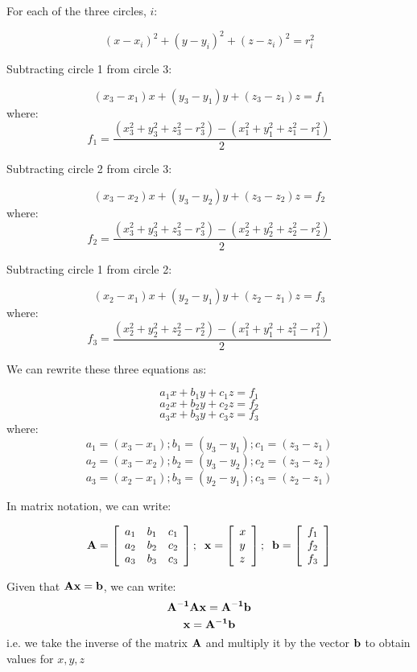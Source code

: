 \documentclass[12pt]{article}
\begin{document}
For each of the three circles, $i$:

$$ (x-x_i)^2 + (y-y_i)^2 + (z-z_i)^2 = r_i^2 $$

Subtracting circle 1 from circle 3:

$$ (x_3-x_1)x + (y_3-y_1)y + (z_3-z_1)z = f_1 $$
where:
$$ f_1 = \frac{(x_3^2 + y_3^2 + z_3^2 - r_3^2) - (x_1^2 + y_1^2 + z_1^2 - r_1^2)}{2} $$

Subtracting circle 2 from circle 3:

$$ (x_3-x_2)x + (y_3-y_2)y + (z_3-z_2)z = f_2 $$
where:
$$ f_2 = \frac{(x_3^2 + y_3^2 + z_3^2 - r_3^2) - (x_2^2 + y_2^2 + z_2^2 - r_2^2)}{2} $$

Subtracting circle 1 from circle 2:

$$ (x_2-x_1)x + (y_2-y_1)y + (z_2-z_1)z = f_3 $$
where:
$$ f_3 = \frac{(x_2^2 + y_2^2 + z_2^2 - r_2^2) - (x_1^2 + y_1^2 + z_1^2 - r_1^2)}{2} $$


We can rewrite these three equations as:

$$ a_1x + b_1y + c_1z = f_1 $$
$$ a_2x + b_2y + c_2z = f_2 $$
$$ a_3x + b_3y + c_3z = f_3 $$
where:
$$ a_1 = (x_3-x_1) ; b_1 = (y_3-y_1) ; c_1 = (z_3-z_1) $$
$$ a_2 = (x_3-x_2) ; b_2 = (y_3-y_2) ; c_2 = (z_3-z_2) $$
$$ a_3 = (x_2-x_1) ; b_3 = (y_2-y_1) ; c_3 = (z_2-z_1) $$

In matrix notation, we can write:

$$
\bf A = \left[ \begin{array}{lll}a_1&b_1&c_1\\a_2&b_2&c_2\\a_3&b_3&c_3\end{array}\right] ;\;\;
    x = \left[ \begin{array}{l}x\\y\\z\end{array}\right] ;\;\;
    b = \left[ \begin{array}{l}f_1\\f_2\\f_3\end{array}\right]
$$


Given that $\bf Ax = b$, we can write:
$$\bf A^{-1}Ax = A^{-1}b$$
$$\bf x=A^{-1}b$$
i.e. we take the inverse of the matrix $\bf A$ and multiply it by the 
vector $\bf b$ to obtain values for $x,y,z$
\end{document}
